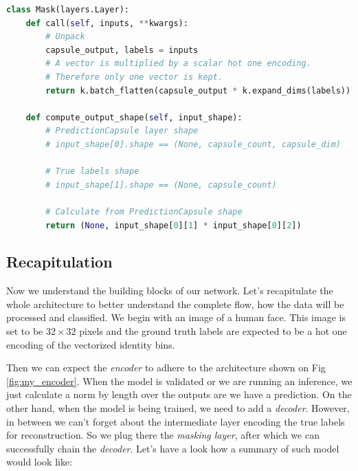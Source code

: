\begin{lstlisting}[language=Python, caption=Masking layer]
class Mask(layers.Layer):
    def call(self, inputs, **kwargs):
        # Unpack
        capsule_output, labels = inputs
        # A vector is multiplied by a scalar hot one encoding.
        # Therefore only one vector is kept.
        return k.batch_flatten(capsule_output * k.expand_dims(labels))

    def compute_output_shape(self, input_shape):
        # PredictionCapsule layer shape
        # input_shape[0].shape == (None, capsule_count, capsule_dim)

        # True labels shape
        # input_shape[1].shape == (None, capsule_count)

        # Calculate from PredictionCapsule shape
        return (None, input_shape[0][1] * input_shape[0][2])
\end{lstlisting}


\subsection{Recapitulation}

Now we understand the building blocks of our network. Let's recapitulate the whole architecture to better understand the complete flow, how the data will be processed and classified. We begin with an image of a human face. This image is set to be $32\times32$ pixels and the ground truth labels are expected to be a hot one encoding of the vectorized identity bins.

Then we can expect the \textit{encoder} to adhere to the architecture shown on Fig\,\ref{fig:my_encoder}. When the model is validated or we are running an inference, we just calculate a norm by length over the outputs are we have a prediction. On the other hand, when the model is being trained, we need to add a \textit{decoder}. However, in between we can't forget about the intermediate layer encoding the true labels for reconstruction. So we plug there the \textit{masking layer}, after which we can successfully chain the \textit{decoder}. Let's have a look how a summary of such model would look like:

